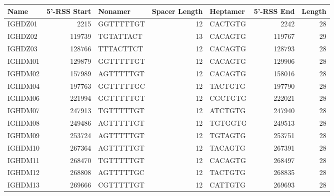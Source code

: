 \begin{tabular}{lrlrlrr}
  \toprule Name & 5'-RSS Start & Nonamer & Spacer Length & Heptamer & 5'-RSS End & Length \\ 
  \midrule IGHDZ01 & 2215 & GGTTTTTGT & 12 & CACTGTG & 2242 & 28 \\ 
  IGHDZ02 & 119739 & TGTATTACT & 13 & CACAGTG & 119767 & 29 \\ 
  IGHDZ03 & 128766 & TTTACTTCT & 12 & CACAGTG & 128793 & 28 \\ 
  IGHDM01 & 129879 & GGTTTTTGT & 12 & CACAGTG & 129906 & 28 \\ 
  IGHDM02 & 157989 & AGTTTTTGT & 12 & CACAGTG & 158016 & 28 \\ 
  IGHDM04 & 197763 & GGTTTTTGC & 12 & TACTGTG & 197790 & 28 \\ 
  IGHDM06 & 221994 & GGTTTTTGT & 12 & CGCTGTG & 222021 & 28 \\ 
  IGHDM07 & 247913 & TGTTTTTGT & 12 & ATCTGTG & 247940 & 28 \\ 
  IGHDM08 & 249486 & AGTTTTTGT & 12 & TGTGGTG & 249513 & 28 \\ 
  IGHDM09 & 253724 & AGTTTTTGT & 12 & TGTAGTG & 253751 & 28 \\ 
  IGHDM10 & 267364 & AGTTTTTGT & 12 & TACAGTG & 267391 & 28 \\ 
  IGHDM11 & 268470 & TGTTTTTGT & 12 & CACAGTG & 268497 & 28 \\ 
  IGHDM12 & 268808 & AGTTTTTGC & 12 & TACTGTG & 268835 & 28 \\ 
  IGHDM13 & 269666 & CGTTTTTGT & 12 & CATTGTG & 269693 & 28 \\ 
   \bottomrule \end{tabular}
